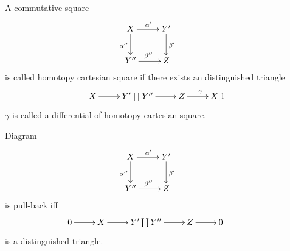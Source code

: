 \begin{mydefn}
A commutative square
\[
\xymatrix{
X \ar[r]^{\alpha'} \ar[d]_{\alpha''} &Y' \ar[d]^{\beta'}&\\
Y'' \ar[r]^{\beta''} & Z &
}
\]
is called homotopy cartesian square if there exists an distinguished triangle
\[
\xymatrix{
X \ar[r] &Y' \coprod Y'' \ar[r]& Z \ar[r]^{\gamma} & X[1]
}
\]
$\gamma$ is called a differential of homotopy cartesian square.
\end{mydefn}

\begin{prop}
Diagram 
\[
\xymatrix{
X \ar[r]^{\alpha'} \ar[d]_{\alpha''} &Y' \ar[d]^{\beta'}&\\
Y'' \ar[r]^{\beta''} & Z &
}
\]
is pull-back iff 
\[
\xymatrix{
0 \ar[r] & X \ar[r] & Y' \coprod Y'' \ar[r] & Z \ar[r] & 0&
}
\]
is a distinguished triangle.
\end{prop}